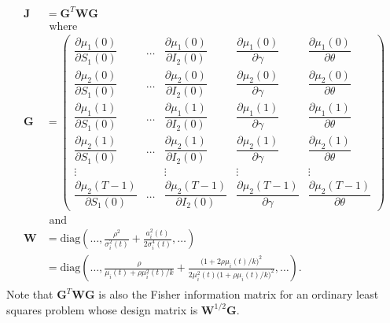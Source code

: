 \documentclass[11pt]{article}
\begin{document}
\begin{align}\label{eq:fim}
  \begin{split}
  \mathbf{J} &= \mathbf{G}^T \mathbf{W} \mathbf{G} \\
  &\text{ where } \\
  \mathbf{G} &= \begin{pmatrix}
    \dfrac{\partial \mu_1(0)}{\partial S_1(0)} &
    \dots &
    \dfrac{\partial \mu_1(0)}{\partial I_2(0)} &
    \dfrac{\partial \mu_1(0)}{\partial \gamma} &
    \dfrac{\partial \mu_1(0)}{\partial \theta} \\[10pt]
    \dfrac{\partial \mu_2(0)}{\partial S_1(0)} &
    \dots &
    \dfrac{\partial \mu_2(0)}{\partial I_2(0)} &
    \dfrac{\partial \mu_2(0)}{\partial \gamma} &
    \dfrac{\partial \mu_2(0)}{\partial \theta} \\[10pt]
    \dfrac{\partial \mu_1(1)}{\partial S_1(0)} &
    \dots &
    \dfrac{\partial \mu_1(1)}{\partial I_2(0)} &
    \dfrac{\partial \mu_1(1)}{\partial \gamma} &
    \dfrac{\partial \mu_1(1)}{\partial \theta} \\[10pt]
    \dfrac{\partial \mu_2(1)}{\partial S_1(0)} &
    \dots &
    \dfrac{\partial \mu_2(1)}{\partial I_2(0)} &
    \dfrac{\partial \mu_2(1)}{\partial \gamma} &
    \dfrac{\partial \mu_2(1)}{\partial \theta} \\[10pt]
    \vdots &  & \vdots & \vdots & \vdots
    \\[6pt]
    \dfrac{\partial \mu_2(T{-}1)}{\partial S_1(0)} &
    \dots &
    \dfrac{\partial \mu_2(T{-}1)}{\partial I_2(0)} &
    \dfrac{\partial \mu_2(T{-}1)}{\partial \gamma} &
    \dfrac{\partial \mu_2(T{-}1)}{\partial \theta}
  \end{pmatrix} \\
  &\text{ and } \\
  \mathbf{W} &= \text{diag} \left(\dots,\frac{\rho^2}{\sigma_i^2(t)} +                                                                      
  \frac{a_i^2(t)}{2\sigma_i^4(t)},\dots\right) \\
  &= \text{diag}\left(\dots,
    \frac{\rho}{\mu_i(t) + \rho\mu_i^2(t)/k}
    + \frac{\bigl(1 + 2\rho\mu_i(t)/k\bigr)^2}
           {2\mu_i^2(t)\bigl(1 + \rho\mu_i(t)/k\bigr)^2},
           \dots\right).
  \end{split}
\end{align}
Note that $\mathbf{G}^T\mathbf{WG}$ is also the Fisher information
matrix for an ordinary least squares problem whose design matrix is
$\mathbf{W}^{1/2}\mathbf{G}$.
\end{document}
